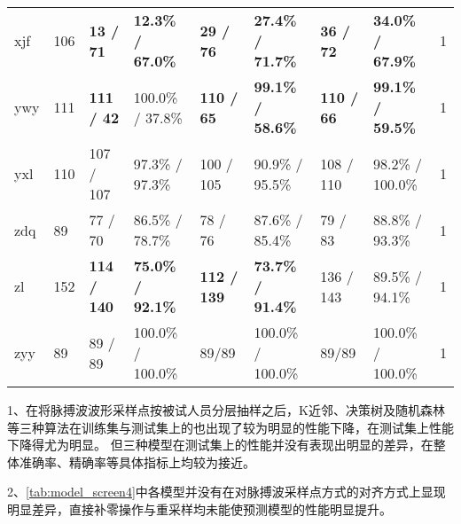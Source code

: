\begin{landscape}
\begin{longtable}{m{2cm}<{\centering}m{2cm}<{\centering}m{2cm}<{\centering}m{2cm}<{\centering}m{2cm}<{\centering}m{2cm}<{\centering}m{2cm}<{\centering}m{2cm}<{\centering}m{2cm}<{\centering}}
            xjf                   & 106                   & \textbf{13 / 71}         & \textbf{12.3\% / 67.0\%}     & \textbf{29 / 76}         & \textbf{27.4\% / 71.7\%}    & \textbf{36 / 72}         & \textbf{34.0\% / 67.9\%}       & 1                                                                      \\
            ywy                   & 111                   & \textbf{111 / 42}        & 100.0\% / 37.8\%     & \textbf{110 / 65}        & \textbf{99.1\% / 58.6\%}    & \textbf{110 / 66}        & \textbf{99.1\% / 59.5\%}    & 1                                                                      \\
            yxl                   & 110                   & 107 / 107        & 97.3\% / 97.3\%   & 100 / 105        & 90.9\% / 95.5\%    & 108 / 110        & 98.2\% / 100.0\%     & 1                                                                      \\
            zdq                   & 89                    & 77 / 70         & 86.5\% / 78.7\%     & 78 / 76         & 87.6\% / 85.4\%     & 79 / 83         & 88.8\% / 93.3\%      & 1                                                                      \\
            zl                    & 152                   & \textbf{114 / 140}        & \textbf{75.0\% / 92.1\%}     & \textbf{112 / 139}         & \textbf{73.7\% / 91.4\%}     & 136 / 143        & 89.5\% / 94.1\%      & 1                                                                      \\
            zyy                   & 89                    & 89 / 89         & 100.0\% / 100.0\%    & 89/89         & 100.0\% / 100.0\%    & 89/89         & 100.0\% / 100.0\%    & 1                                                                       \\    
      \end{longtable}
\end{landscape}
\noindent

1、在将脉搏波波形采样点按被试人员分层抽样之后，K近邻、决策树及随机森林等三种算法在训练集与测试集上的也出现了较为明显的性能下降，在测试集上性能下降得尤为明显。
但三种模型在测试集上的性能并没有表现出明显的差异，在整体准确率、精确率等具体指标上均较为接近。

2、\autoref{tab:model_screen4}中各模型并没有在对脉搏波采样点方式的对齐方式上显现明显差异，直接补零操作与重采样均未能使预测模型的性能明显提升。

